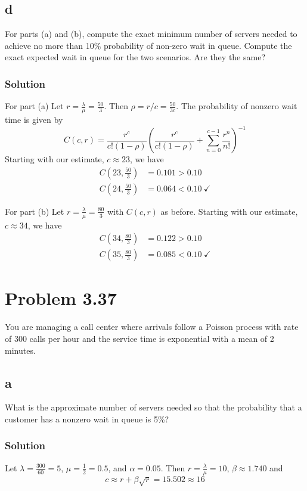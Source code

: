 \documentclass[letterpaper]{amsart}
\begin{document}
\subsection*{d}
For parts (a) and (b), compute the exact minimum number of servers
needed to achieve no more than 10\% probability of non-zero wait in
queue. Compute the exact expected wait in queue for the two scenarios.
Are they the same?
\subsubsection*{Solution}
For part (a) Let $r=\frac{\lambda}{\mu}=\frac{50}{3}$. Then $\rho=r/c = \frac{50}{3c}$.
The probability of nonzero wait time is given by
\begin{equation*}
  C(c,r)=\frac{r^c}{c!(1-\rho)}\left( \frac{r^c}{c!(1-\rho)}+\sum_{n=0}^{c-1}\frac{r^n}{n!}\right)^{-1}
\end{equation*}
Starting with our estimate, $c\approx23$, we have
\begin{align*}
  C(23,\frac{50}{3}) &= 0.101 > 0.10 \\
  C(24,\frac{50}{3}) &= 0.064 < 0.10\ \checkmark
\end{align*}

For part (b) Let $r=\frac{\lambda}{\mu}=\frac{80}{3}$ with $C(c,r)$ as before.
Starting with our estimate, $c\approx34$, we have
\begin{align*}
  C(34,\frac{80}{3}) &= 0.122 > 0.10 \\
  C(35,\frac{80}{3}) &= 0.085 < 0.10\ \checkmark
\end{align*}

\section{Problem 3.37} %
You are managing a call center where arrivals follow a Poisson process with
rate of 300 calls per hour and the service time is exponential with a mean of
2 minutes.
\subsection*{a}
What is the approximate number of servers needed so that the probability that a
customer has a nonzero wait in queue is 5\%?

\subsubsection*{Solution}
Let $\lambda = \frac{300}{60}=5$, $\mu=\frac{1}{2}=0.5$, and $\alpha=0.05$. Then
$r=\frac{\lambda}{\mu}=10$, $\beta\approx1.740$ and
\begin{equation*}
  c\approx r + \beta\sqrt{r} = 15.502 \approx 16
\end{equation*}
\end{document}
